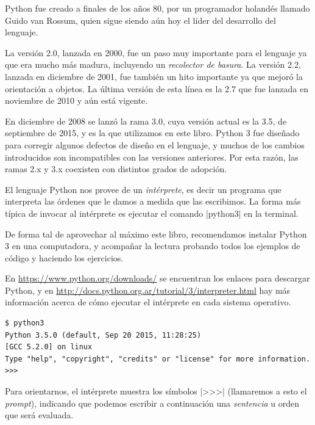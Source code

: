 \begin{sabias_que}
Python fue creado a finales de los años 80, por un programador holandés
llamado Guido van Rossum, quien sigue siendo aún hoy el líder del
desarrollo del lenguaje.

La versión 2.0, lanzada en 2000, fue un paso muy importante para el
lenguaje ya que era mucho más madura, incluyendo un \textit{recolector de
basura}.  La versión 2.2, lanzada en diciembre de 2001, fue también un hito
importante ya que mejoró la orientación a objetos.  La última versión de
esta línea es la 2.7 que fue lanzada en noviembre de 2010 y aún está vigente.

En diciembre de 2008 se lanzó la rama 3.0, cuya versión actual es la 3.5, de
septiembre de 2015, y es la que utilizamos en este libro. Python 3 fue diseñado
para corregir algunos defectos de diseño en el lenguaje, y muchos de los
cambios introducidos son incompatibles con las versiones anteriores. Por esta
razón, las ramas 2.x y 3.x coexisten con distintos grados de adopción.
\end{sabias_que}

El lenguaje Python nos provee de un {\it intérprete}, es decir un programa que
interpreta las órdenes que le damos a medida que las escribimos. La forma más
típica de invocar al intérprete es ejecutar el comando |python3| en
la terminal.

\begin{atencion}
De forma tal de aprovechar al máximo este libro, recomendamos instalar Python 3
en una computadora, y acompañar la lectura probando todos los ejemplos de
código y haciendo los ejercicios.

En \url{https://www.python.org/downloads/} se encuentran los enlaces para
descargar Python, y en
\url{http://docs.python.org.ar/tutorial/3/interpreter.html} hay más información
acerca de cómo ejecutar el intérprete en cada sistema operativo.
\end{atencion}

\begin{lstlisting}[language={},numbers=none]
$ python3
Python 3.5.0 (default, Sep 20 2015, 11:28:25)
[GCC 5.2.0] on linux
Type "help", "copyright", "credits" or "license" for more information.
>>>
\end{lstlisting}

Para orientarnos, el intérprete muestra los símbolos |>>>| (llamaremos a esto
el {\it prompt}), indicando que podemos escribir a continuación una {\it
sentencia} u orden que será evaluada.

